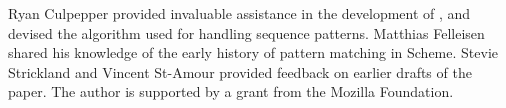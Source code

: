 \documentclass[onecolumn]{llncs}
\newcommand{\postDoc}{}
\newcommand{\Scribtexttt}[1]{{\texttt{#1}}}
\newcommand{\SColorize}[2]{\color{#1}{#2}}
\newcommand{\inColor}[2]{{\Scribtexttt{\SColorize{#1}{#2}}}}
\newcommand{\RktSym}[1]{\inColor{IdentifierColor}{#1}}
\begin{document}

Ryan Culpepper provided invaluable assistance in the development of
\RktSym{\RktStxLink{match}}, and devised the algorithm used for handling sequence patterns.  Matthias
Felleisen shared his knowledge of the early history of pattern
matching in Scheme. Stevie Strickland and Vincent St{-}Amour provided
feedback on earlier drafts of the paper.  The author is supported by a
grant from the Mozilla Foundation.



\postDoc
\end{document}
